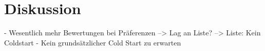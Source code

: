 \chapter{Diskussion}
\label{ch:diskussion}
- Wesentlich mehr Bewertungen bei Präferenzen --> Lag an Liste? --> Liste: Kein Coldstart
- Kein grundsätzlicher Cold Start zu erwarten


